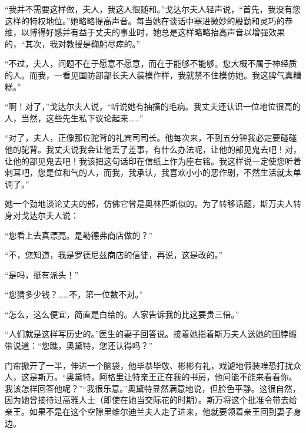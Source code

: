\par “我并不需要这样做，夫人，我这人很随和。”戈达尔夫人轻声说，“首先，我没有您这样的特权地位。”她略略提高声音。每当她在谈话中塞进微妙的殷勤和灵巧的恭维，以博得好感并有益于丈夫的事业时，她总是这样略略抬高声音以增强效果的，“其次，我对教授是鞠躬尽瘁的。”
\par “不过，夫人，问题不在于愿意不愿意，而在于能够不能够。您大概不属于神经质的人。而我，一看见国防部部长夫人装模作样，我就禁不住模仿她。我这脾气真糟糕。”
\par “啊！对了，”戈达尔夫人说，“听说她有抽搐的毛病。我丈夫还认识一位地位很高的人，当然，这些先生私下议论起来……”
\par “对了，夫人，正像那位驼背的礼宾司司长。他每次来，不到五分钟我必定要碰碰他的驼背。我丈夫说我会让他丢了差事，有什么办法呢，让他的部见鬼去吧！对，让他的部见鬼去吧！我该把这句话印在信纸上作为座右铭。我这样说一定使您听着刺耳吧，您是位和气的人，而我，我承认，我喜欢小小的恶作剧，不然生活就太单调了。”
\par 她一个劲地谈论丈夫的部，仿佛它曾是奥林匹斯似的。为了转移话题，斯万夫人转身对戈达尔夫人说：
\par “您看上去真漂亮。是勒德弗商店做的？”
\par “不，您知道，我是罗德尼兹商店的信徒，再说，这是改的。”
\par “是吗，挺有派头！”
\par “您猜多少钱？……不，第一位数不对。”
\par “怎么，这么便宜，简直是白给的。人家告诉我的比这要贵三倍。”
\par “人们就是这样写历史的。”医生的妻子回答说。接着她指着斯万夫人送她的围脖缎带说道：“您瞧，奥黛特，您还认得吗？”
\par 门帘掀开了一半，伸进一个脑袋，他毕恭毕敬、彬彬有礼，戏谑地假装唯恐打扰众人，这是斯万。“奥黛特，阿格里让特亲王正在我的书房，他问能不能来看看你。我该怎样回答他呢？”“我很乐意。”奥黛特显然满意地说，但脸色平静。这很自然，因为她曾接待过高雅人士（即使在她当交际花的时期）。斯万将这个批准令带去给亲王。如果不是在这个空隙里维尔迪兰夫人走了进来，他就要领着亲王回到妻子身边。
